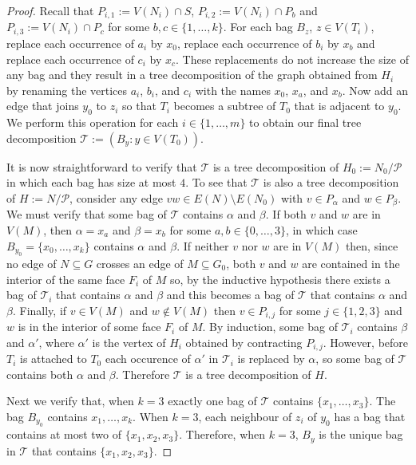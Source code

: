 \documentclass{patmorin}
\theoremstyle{plain}
\theoremstyle{definition}
\begin{document}
\begin{proof}
	Recall that $P_{i,1}:=V(N_i)\cap S$, $P_{i,2}:=V(N_i)\cap P_b$ and $P_{i,3}:=V(N_i)\cap P_c$ for some $b,c\in\{1,\ldots,k\}$.  For each bag $B_z$, $z\in V(T_i)$, replace each occurrence of $a_i$ by $x_0$, replace each occurrence of $b_i$ by $x_b$ and replace each occurrence of $c_i$ by $x_c$.  These replacements do not increase the size of any bag and they result in a tree decomposition of the graph obtained from $H_i$ by renaming the vertices $a_i$, $b_i$, and $c_i$ with the names $x_0$, $x_a$, and $x_b$. Now add an edge that joins $y_0$ to $z_i$ so that $T_i$ becomes a subtree of $T_0$ that is adjacent to $y_0$.  We perform this operation for each $i\in\{1,\ldots,m\}$ to obtain our final tree decomposition $\mathcal{T}:=(B_y:y\in V(T_0))$.

  It is now straightforward to verify that $\mathcal{T}$ is a tree decomposition of $H_0:=N_0/\mathcal{P}$ in which each bag has size at most $4$.    To see that $\mathcal{T}$ is also a tree decomposition of $H:=N/\mathcal{P}$, consider any edge $vw\in E(N)\setminus E(N_0)$ with $v\in P_\alpha$ and $w\in P_\beta$.  We must verify that some bag of $\mathcal{T}$ contains $\alpha$ and $\beta$.  If both $v$ and $w$ are in $V(M)$, then $\alpha=x_a$ and $\beta=x_b$ for some $a,b\in\{0,\ldots,3\}$, in which case $B_{y_0}=\{x_0,\ldots,x_k\}$ contains $\alpha$ and $\beta$.  If neither $v$ nor $w$ are in $V(M)$ then, since no edge of $N\subseteq G$ crosses an edge of $M\subseteq G_0$, both $v$ and $w$ are contained in the interior of the same face $F_i$ of $M$ so, by the inductive hypothesis there exists a bag of $\mathcal{T}_i$ that contains $\alpha$ and $\beta$ and this becomes a bag of $\mathcal{T}$ that contains $\alpha$ and $\beta$.  Finally, if $v\in V(M)$ and $w\not\in V(M)$ then $v\in P_{i,j}$ for some $j\in\{1,2,3\}$ and $w$ is in the interior of some face $F_i$ of $M$. By induction, some bag of $\mathcal{T}_i$ contains $\beta$ and $\alpha'$, where $\alpha'$ is the vertex of $H_i$ obtained by contracting $P_{i,j}$.  However, before $T_i$ is attached to $T_0$ each occurence of $\alpha'$ in $\mathcal{T}_i$ is replaced by $\alpha$, so some bag of $\mathcal{T}$ contains both $\alpha$ and $\beta$. Therefore $\mathcal{T}$ is a tree decomposition of $H$.

  Next we verify that, when $k=3$ exactly one bag of $\mathcal{T}$ contains $\{x_1,\ldots,x_3\}$.  The bag $B_{y_0}$ contains $x_1,\ldots,x_k$. When $k=3$, each neighbour of $z_i$ of $y_0$ has a bag that contains at most two of $\{x_1,x_2,x_3\}$.  Therefore, when $k=3$, $B_y$ is the unique bag in $\mathcal{T}$ that contains $\{x_1,x_2,x_3\}$.


\end{proof}
\end{document}
